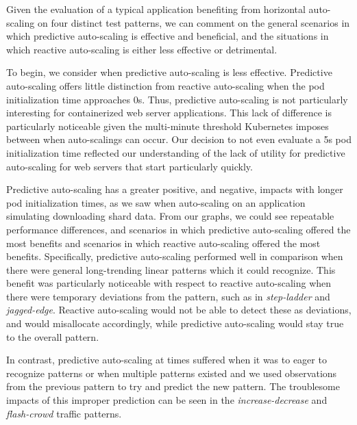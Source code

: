Given the evaluation of a typical application benefiting from horizontal
auto-scaling on four distinct test patterns, we can comment on the general
scenarios in which predictive auto-scaling is effective and beneficial, and the
situations in which reactive auto-scaling is either less effective or
detrimental.

To begin, we consider when predictive auto-scaling is less
effective. Predictive auto-scaling offers little distinction from reactive
auto-scaling when the pod initialization time approaches 0s. Thus, predictive
auto-scaling is not particularly interesting for containerized web server
applications. This lack of difference is particularly noticeable given the
multi-minute threshold Kubernetes imposes between when auto-scalings can occur.
Our decision to not even evaluate a 5s pod initialization time reflected our
understanding of the lack of utility for predictive auto-scaling for web servers
that start particularly quickly.

Predictive auto-scaling has a greater positive, and negative, impacts
with longer pod initialization times, as we saw when auto-scaling on an
application simulating downloading shard data. From our graphs, we could see
repeatable performance differences, and scenarios in which predictive
auto-scaling offered the most benefits and scenarios in which reactive
auto-scaling offered the most benefits. Specifically, predictive auto-scaling
performed well in comparison when there were general long-trending linear
patterns which it could recognize. This benefit was particularly noticeable with
respect to reactive auto-scaling when there were temporary deviations from the
pattern, such as in \textit{step-ladder} and \textit{jagged-edge}. Reactive
auto-scaling would not be able to detect these as deviations, and would
misallocate accordingly, while predictive auto-scaling would stay true to the
overall pattern.

In contrast, predictive auto-scaling at times suffered when it was to eager to
recognize patterns or when multiple patterns existed and we used observations
from the previous pattern to try and predict the new pattern. The troublesome
impacts of this improper prediction can be seen in the
\textit{increase-decrease} and \textit{flash-crowd} traffic patterns.

